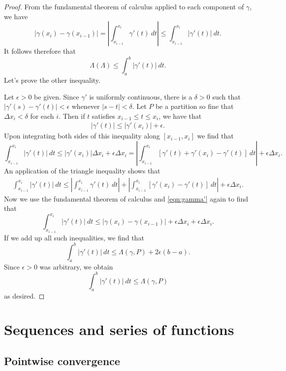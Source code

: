 \documentclass[12pt]{article}
\theoremstyle{definition}
\theoremstyle{theorem}
\begin{document}
\begin{proof}
From the fundamental theorem of calculus applied to each component of $\gamma$, we have 
\[
|\gamma(x_i) - \gamma(x_{i-1})| = \left|\int_{x_{i-1}}^{x_i} \gamma'(t) \: dt  \right| \leqslant \int_{x_{i-1}}^{x_i} |\gamma'(t)| \: dt.
\]
It follows therefore that  
\[
\Lambda(\Lambda) \leqslant \int_{a}^b |\gamma'(t)| \:dt. 
\]
Let's prove the other inequality. 

Let $\epsilon > 0$ be given. Since $\gamma'$ is uniformly continuous, there is a $\delta > 0$ such that $|\gamma'(s) - \gamma'(t)| < \epsilon$ whenever $|s - t| < \delta$. Let $P$ be a partition so fine that $\Delta x_i < \delta$ for each $i$. Then if $t$ satisfies $x_{i-1} \leqslant t \leqslant x_i$, we have that 
\begin{align}\label{eqn:gamma'}
|\gamma'(t)| \leqslant |\gamma'(x_i)| + \epsilon.
\end{align}
Upon integrating both sides of this inequality along $[x_{i-1}, x_i]$ we find that 
\[
\int_{x_{i-1}}^{x_i} |\gamma'(t)|\: dt \leqslant |\gamma'(x_i)| \Delta x_i + \epsilon \Delta x_i = \left|\int_{x_{i-1}}^{x_i} [\gamma'(t) + \gamma'(x_i) - \gamma'(t)] \: dt\right| + \epsilon \Delta x_i.
\]
An application of the triangle inequality shows that  
\begin{align*}
\int_{x_{i-1}}^{x_i} |\gamma'(t)| \: dt \leqslant \left|\int_{x_{i-1}}^{x_i} \gamma'(t) \: dt\right| + \left|\int_{x_{i-1}}^{x_i} [\gamma'(x_i) - \gamma'(t)] \: dt\right|  + \epsilon \Delta x_i.
\end{align*}
Now we use the fundamental theorem of calculus and \eqref{eqn:gamma'} again to find that 
\[
\int_{x_{i-1}}^{x_i} |\gamma'(t)|\: dt \leqslant |\gamma(x_i) - \gamma(x_{i-1})| + \epsilon \Delta x_i + \epsilon \Delta x_i.
\] 
If we add up all such inequalities, we find that 
\[
\int_a^b |\gamma'(t)| \: dt \leqslant \Lambda(\gamma,P) + 2 \epsilon(b-a).
\]
Since $\epsilon > 0$ was arbitrary, we obtain 
\[
\int_a^b |\gamma'(t)| \: dt \leqslant \Lambda(\gamma,P)
\]
as desired. 
\end{proof}

\section{Sequences and series of functions}


\subsection{Pointwise convergence}
\end{document}
